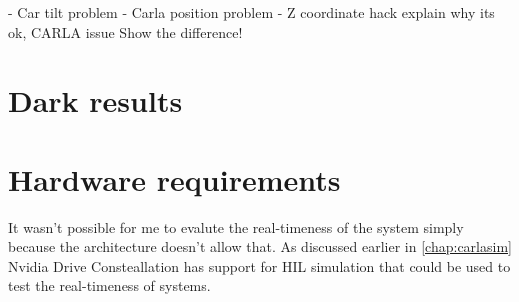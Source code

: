 - Car tilt problem - Carla
position problem - Z coordinate hack explain why its ok, CARLA issue Show the
difference!

\section{Dark results}


\section{Hardware requirements}
It wasn't possible for me to evalute the real-timeness of the system simply
because the architecture doesn't allow that. As discussed earlier in
\autoref{chap:carlasim} Nvidia Drive Consteallation has support for HIL
simulation that could be used to test the real-timeness of systems.